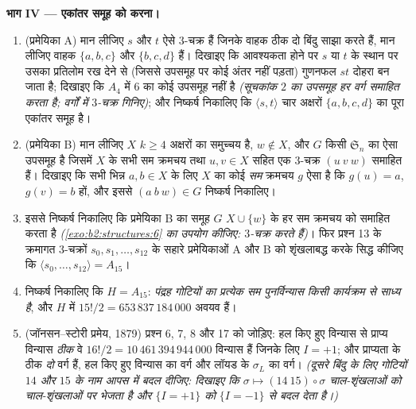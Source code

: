 \begin{problem}
\medskip
\noindent\textbf{भाग IV --- एकांतर समूह को  करना।}
\begin{enumerate}[resume]
  \item (प्रमेयिका A) मान लीजिए $s$ और $t$ ऐसे $3$-चक्र हैं जिनके
        वाहक ठीक दो बिंदु साझा करते हैं, मान लीजिए वाहक $\{a, b, c\}$ और $\{b, c, d\}$
        हैं। दिखाइए कि आवश्यकता होने पर $s$ या $t$ के स्थान पर उसका
        प्रतिलोम रख देने से (जिससे  उपसमूह पर कोई अंतर नहीं पड़ता)
        गुणनफल $st$ दोहरा  बन जाता है; दिखाइए कि $A_4$ में 
        $6$ का कोई उपसमूह नहीं है \emph{(सूचकांक $2$ का उपसमूह हर वर्ग
        समाहित करता है; वर्गों में $3$-चक्र गिनिए)}; और निष्कर्ष
        निकालिए कि $\langle s, t\rangle$ चार अक्षरों $\{a, b, c, d\}$ का पूरा एकांतर समूह है।
  \item (प्रमेयिका B) मान लीजिए $X$ $k \geq 4$ अक्षरों का समुच्चय है,
        $w
        \notin X$, और $G$ किसी $\mathfrak{S}_n$ का ऐसा उपसमूह है जिसमें $X$ के सभी
        सम क्रमचय तथा $u, v \in X$ सहित एक $3$-चक्र $(u\ v\ w)$ समाहित हैं।
        दिखाइए कि सभी भिन्न $a, b \in X$ के लिए $X$ का कोई \emph{सम} क्रमचय
        $g$ ऐसा है कि $g(u) = a$, $g(v) = b$ हों, और इससे $(a\ b\ w) \in G$ निष्कर्ष
        निकालिए।
  \item इससे निष्कर्ष निकालिए कि प्रमेयिका B का समूह $G$ $X \cup \{w\}$ के हर
        सम क्रमचय को समाहित करता है \emph{(\cref{exo:b2:structures:6} का उपयोग कीजिए:
        $3$-चक्र  करते हैं)}। फिर प्रश्न 13 के क्रमागत
        $3$-चक्रों $s_0, s_1, \dots, s_{12}$ के सहारे प्रमेयिकाओं A और B को शृंखलाबद्ध
        करके सिद्ध कीजिए कि $\langle s_0, \dots, s_{12}\rangle = A_{15}$।
  \item निष्कर्ष निकालिए कि $H = A_{15}$: \emph{पंद्रह गोटियों का प्रत्येक सम
        पुनर्विन्यास किसी कार्यक्रम से साध्य है}, और $H$ में $15!/2 = 653\,837\,184\,000$
        अवयव हैं।
  \item (जॉनसन--स्टोरी प्रमेय, 1879) प्रश्न 6, 7, 8 और 17 को जोड़िए:
        हल किए हुए विन्यास से प्राप्य विन्यास \emph{ठीक} वे $16!/2 =
        10\,461\,394\,944\,000$
        विन्यास हैं जिनके लिए $I = +1$; और प्राप्यता के ठीक \emph{दो}
        वर्ग हैं, हल किए हुए विन्यास का वर्ग और लॉयड के $\sigma_L$ का वर्ग।
        \emph{(दूसरे बिंदु के लिए गोटियों $14$ और $15$ के नाम आपस में
        बदल दीजिए: दिखाइए कि $\sigma \mapsto (14\ 15) \circ
        \sigma$ चाल-शृंखलाओं को चाल-शृंखलाओं पर
        भेजता है और $\{I = +1\}$ को $\{I = -1\}$ से बदल देता है।)}
\end{enumerate}


\end{problem}
